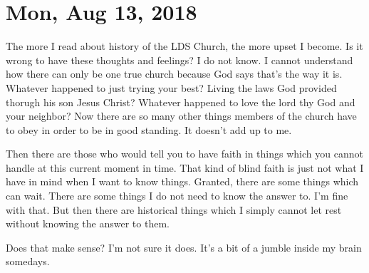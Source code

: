 \section{Mon, Aug 13, 2018}

The more I read about history of the LDS Church, the more upset I become. Is it wrong
to have these thoughts and feelings? I do not know. I cannot understand how there can
only be one true church because God says that's the way it is. Whatever happened to
just trying your best? Living the laws God provided thorugh his son Jesus Christ?
Whatever happened to love the lord thy God and your neighbor? Now there are so many
other things members of the church have to obey in order to be in good standing. It
doesn't add up to me.

Then there are those who would tell you to have faith in things which you cannot
handle at this current moment in time. That kind of blind faith is just not what I
have in mind when I want to know things. Granted, there are some things which can
wait. There are some things I do not need to know the answer to. I'm fine with that.
But then there are historical things which I simply cannot let rest without knowing
the answer to them.

Does that make sense? I'm not sure it does. It's a bit of a jumble inside my brain
somedays.
